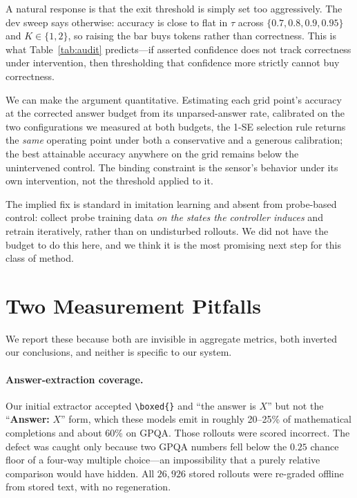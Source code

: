 A natural response is that the exit threshold is simply set too aggressively.
The dev sweep says otherwise: accuracy is close to flat in $\tau$ across
$\{0.7,0.8,0.9,0.95\}$ and $K \in \{1,2\}$, so raising the bar buys tokens
rather than correctness. This is what Table~\ref{tab:audit} predicts---if
asserted confidence does not track correctness under intervention, then
thresholding that confidence more strictly cannot buy correctness.

We can make the argument quantitative. Estimating each grid point's accuracy
at the corrected answer budget from its unparsed-answer rate, calibrated on
the two configurations we measured at both budgets, the 1-SE selection rule
returns the \emph{same} operating point under both a conservative and a
generous calibration; the best attainable accuracy anywhere on the grid
remains below the unintervened control. The binding constraint is the sensor's
behavior under its own intervention, not the threshold applied to it.

The implied fix is standard in imitation learning and absent from probe-based
control: collect probe training data \emph{on the states the controller
induces} and retrain iteratively, rather than on undisturbed rollouts. We did
not have the budget to do this here, and we think it is the most promising
next step for this class of method.

\section{Two Measurement Pitfalls}
\label{sec:pitfalls}

We report these because both are invisible in aggregate metrics, both inverted
our conclusions, and neither is specific to our system.

\paragraph{Answer-extraction coverage.} Our initial extractor accepted
\verb|\boxed{}| and ``the answer is $X$'' but not the
``\textbf{Answer:} $X$'' form, which these models emit in roughly 20--25\% of
mathematical completions and about 60\% on GPQA. Those rollouts were scored
incorrect. The defect was caught only because two GPQA numbers fell below the
$0.25$ chance floor of a four-way multiple choice---an impossibility that a
purely relative comparison would have hidden. All $26{,}926$ stored rollouts
were re-graded offline from stored text, with no regeneration.


